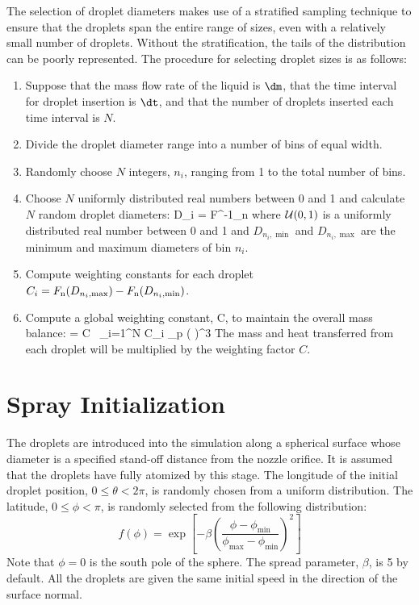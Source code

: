 The selection of droplet diameters makes use of a stratified sampling technique to ensure that the droplets span the entire range of sizes, even with a relatively small number of droplets. Without the stratification, the tails of the distribution can be poorly represented. The procedure for selecting droplet sizes is as follows:
\begin{enumerate}
\item Suppose that the mass flow rate of the liquid is $\dm$, that the time interval for droplet insertion is $\dt$, and that the number of droplets inserted each time interval is $N$.
\item Divide the droplet diameter range into a number of bins of equal width.
\item Randomly choose $N$ integers, $n_i$, ranging from 1 to the total number of bins.
\item Choose $N$ uniformly distributed real numbers between 0 and 1 and calculate $N$ random droplet diameters:
\be
   D_i = F^{-1}_{\rm n}  \label{Ud_strat}
\ee
where ${\cal U}(0,1)$ is a uniformly distributed real number between 0 and 1 and $D_{n_i,\min}$ and $D_{n_i,\max}$ are the minimum and maximum diameters of bin $n_i$.
\item Compute weighting constants for each droplet $C_i = F_{\rm n}(D_{n_i,\max}) - F_{\rm n}(D_{n_i,\min})$.
\item Compute a global weighting constant, C, to maintain the overall mass balance:
    \be \dm \; \dt = C \, \sum_{i=1}^N \; C_i \;  \pi \rho_{\rm p}
      \left(  \right)^3
    \ee
    The mass and heat transferred from each droplet will be multiplied by the weighting factor $C$.
\end{enumerate}

\newpage
\section{Spray Initialization}

The droplets are introduced into the simulation along a spherical surface whose diameter is a specified stand-off distance from the nozzle orifice. It is assumed that the droplets have fully atomized by this stage. The longitude of the initial droplet position, $0\le \theta < 2 \pi$, is randomly chosen from a uniform distribution. The latitude, $0 \le \phi < \pi$, is randomly selected from the following distribution:
\begin{equation}
  f(\phi) = \exp \left[ - \beta \left( \frac{\phi - \phi_{\min}}{\phi_{\max} - \phi_{\min}} \right)^2 \right]
\end{equation}
Note that $\phi=0$ is the south pole of the sphere. The spread parameter, $\beta$, is 5 by default. All the droplets are given the same initial speed in the direction of the surface normal.



